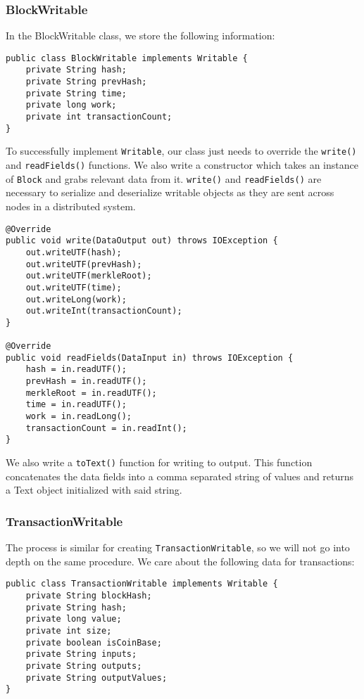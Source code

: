 \documentclass[9pt,twocolumn,twoside]{idsi}
\begin{document}
\subsubsection{BlockWritable}
In the BlockWritable class, we store the following information:

\begin{lstlisting}
public class BlockWritable implements Writable {
    private String hash;
    private String prevHash;
    private String time;
    private long work;
    private int transactionCount;
}
\end{lstlisting}

To successfully implement \lstinline{Writable}, our class just needs to override the \lstinline{write()} and \lstinline{readFields()} functions. We also write a  constructor which takes an instance of \lstinline{Block} and grabs relevant data from it. \lstinline{write()} and \lstinline{readFields()} are necessary to serialize and deserialize writable objects as they are sent across nodes in a distributed system.

\begin{lstlisting}
@Override
public void write(DataOutput out) throws IOException {
    out.writeUTF(hash);
    out.writeUTF(prevHash);
    out.writeUTF(merkleRoot);
    out.writeUTF(time);
    out.writeLong(work);
    out.writeInt(transactionCount);
}

@Override
public void readFields(DataInput in) throws IOException {
    hash = in.readUTF();
    prevHash = in.readUTF();
    merkleRoot = in.readUTF();
    time = in.readUTF();
    work = in.readLong();
    transactionCount = in.readInt();
}
\end{lstlisting}

We also write a \lstinline{toText()} function for writing to output. This function concatenates the data fields into a comma separated string of values and returns a Text object initialized with said string.

\subsubsection{TransactionWritable}
The process is similar for creating \lstinline{TransactionWritable}, so we will not go into depth on the same procedure. We care about the following data for transactions:

\begin{lstlisting}
public class TransactionWritable implements Writable {
    private String blockHash;
    private String hash;
    private long value;
    private int size;
    private boolean isCoinBase;
    private String inputs;
    private String outputs;
    private String outputValues;
}
\end{lstlisting}
\end{document}
